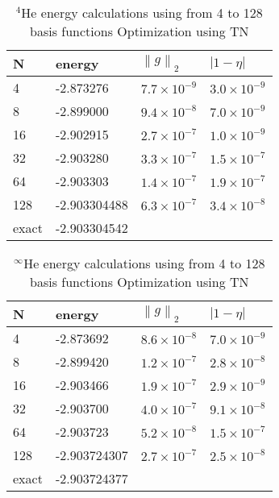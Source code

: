 \documentclass[12pt,thmsa]{article}
\begin{document}
\begin{table}[p] \centering%
\begin{tabular}{llll}
\hline\hline
N & energy & $\left\| g\right\| _2$ & $\left| 1-\eta \right| $ \\ \hline
4 & -2.873276 & $7.7\times 10^{-9}$ & $3.0\times 10^{-9}$ \\ 
8 & -2.899000 & $9.4\times 10^{-8}$ & $7.0\times 10^{-9}$ \\ 
16 & -2.902915 & $2.7\times 10^{-7}$ & $1.0\times 10^{-9}$ \\ 
32 & -2.903280 & $3.3\times 10^{-7}$ & $1.5\times 10^{-7}$ \\ 
64 & -2.903303 & $1.4\times 10^{-7}$ & $1.9\times 10^{-7}$ \\ 
128 & -2.903304488 & $6.3\times 10^{-7}$ & $3.4\times 10^{-8}$ \\ 
exact\cite{Haftel94} & -2.903304542 &  &  \\ \hline\hline
\end{tabular}
\caption{$ ^{4}$He energy calculations using from 4 to 128 basis functions
 Optimization using TN\label{He4eng}}%
\end{table}%

\begin{table}[p] \centering%
\begin{tabular}{llll}
\hline\hline
N & energy & $\left\| g\right\| _2$ & $\left| 1-\eta \right| $ \\ \hline
4 & -2.873692 & $8.6\times 10^{-8}$ & $7.0\times 10^{-9}$ \\ 
8 & -2.899420 & $1.2\times 10^{-7}$ & $2.8\times 10^{-8}$ \\ 
16 & -2.903466 & $1.9\times 10^{-7}$ & $2.9\times 10^{-9}$ \\ 
32 & -2.903700 & $4.0\times 10^{-7}$ & $9.1\times 10^{-8}$ \\ 
64 & -2.903723 & $5.2\times 10^{-8}$ & $1.5\times 10^{-7}$ \\ 
128 & -2.903724307 & $2.7\times 10^{-7}$ & $2.5\times 10^{-8}$ \\ 
exact\cite{Baker90,Drake88,Thakkar94} & -2.903724377 &  &  \\ \hline\hline
\end{tabular}
\caption{$ ^{\infty}$He energy calculations using from 4 to 128 basis functions
 Optimization using TN\label{Heeng}}%
\end{table}%
\end{document}
